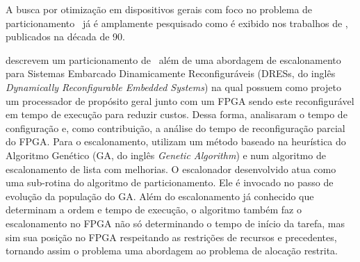     
    A busca por otimização em dispositivos gerais com foco no problema de particionamento \hs\ já é amplamente pesquisado como é exibido nos trabalhos de \citet{Ernst1993, Gupta1995, Hardt1995, Gajski1994, Bolsens1997}, publicados na década de 90.
    
    \citet{Mei2000} descrevem um particionamento de \hs\ além de uma abordagem de escalonamento para Sistemas Embarcado Dinamicamente Reconfiguráveis (DRESs, do inglês \textit{Dynamically Reconfigurable Embedded Systems}) na qual possuem como projeto um processador de propósito geral junto com um FPGA sendo este reconfigurável em tempo de execução para reduzir custos.
    Dessa forma, analisaram o tempo de configuração e, como contribuição, a análise do tempo de reconfiguração parcial do FPGA.
    Para o escalonamento, utilizam um método baseado na heurística do Algoritmo Genético (GA, do inglês \textit{Genetic Algorithm}) e num algoritmo de escalonamento de lista com melhorias.
    O escalonador desenvolvido atua como uma sub-rotina do algoritmo de particionamento. 
    Ele é invocado no passo de evolução da população do GA. 
    Além do escalonamento já conhecido que determinam a ordem e tempo de execução, o algoritmo também faz o escalonamento no FPGA não só determinando o tempo de início da tarefa, mas sim sua posição no FPGA respeitando as restrições de recursos e precedentes, tornando assim o problema uma abordagem ao problema de alocação restrita.
    
